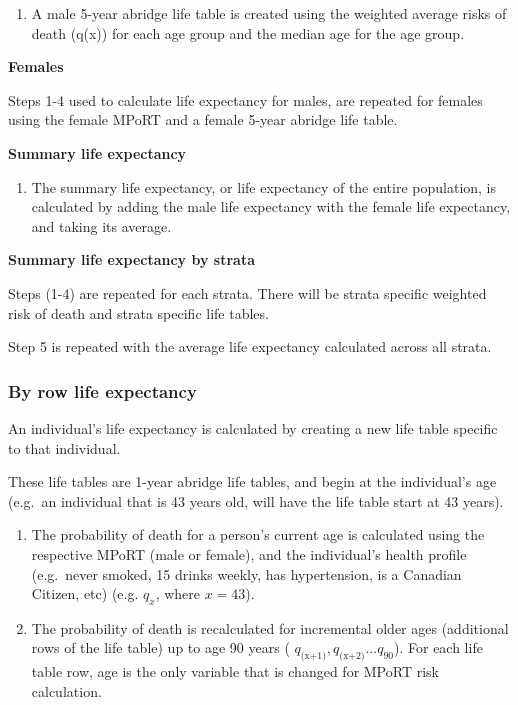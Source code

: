 \documentclass[]{book}
\providecommand{\tightlist}{%
  \setlength{\itemsep}{0pt}\setlength{\parskip}{0pt}}
\begin{document}
\begin{enumerate}
\def\labelenumi{\arabic{enumi}.}
\setcounter{enumi}{3}
\tightlist
\item
  A male 5-year abridge life table is created using the weighted average
  risks of death (q(x)) for each age group and the median age for the
  age group.
\end{enumerate}

\textbf{Females}

Steps 1-4 used to calculate life expectancy for males, are repeated for
females using the female MPoRT and a female 5-year abridge life table.

\textbf{Summary life expectancy}

\begin{enumerate}
\def\labelenumi{\arabic{enumi}.}
\setcounter{enumi}{4}
\tightlist
\item
  The summary life expectancy, or life expectancy of the entire
  population, is calculated by adding the male life expectancy with the
  female life expectancy, and taking its average.
\end{enumerate}

\textbf{Summary life expectancy by strata}

Steps (1-4) are repeated for each strata. There will be strata specific
weighted risk of death and strata specific life tables.

Step 5 is repeated with the average life expectancy calculated across
all strata.

\subsubsection{By row life expectancy}\label{by-row-life-expectancy}

An individual's life expectancy is calculated by creating a new life
table specific to that individual.

These life tables are 1-year abridge life tables, and begin at the
individual's age (e.g.~an individual that is 43 years old, will have the
life table start at 43 years).

\begin{enumerate}
\def\labelenumi{\arabic{enumi}.}
\item
  The probability of death for a person's current age is calculated
  using the respective MPoRT (male or female), and the individual's
  health profile (e.g.~never smoked, 15 drinks weekly, has hypertension,
  is a Canadian Citizen, etc) (e.g. \(q_x\), where \(x=43\)).
\item
  The probability of death is recalculated for incremental older ages
  (additional rows of the life table) up to age 90 years (
  \(q_\text{(x+1)}, q_\text{(x+2)}...q_{90}\)). For each life table row,
  age is the only variable that is changed for MPoRT risk calculation.
\end{enumerate}
\end{document}
